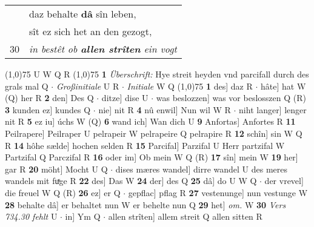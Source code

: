 \documentclass[8pt,a4paper,notitlepage]{article}
\begin{document}
\begin{table}[ht]
\begin{minipage}[t]{0.5\linewidth}
\begin{tabular}{rl}
 & daz behalte \textbf{dâ} sîn leben,\\ 
 & sît ez sich het an den gezogt,\\ 
30 & \textit{in bestêt ob \textbf{allen strîten} ein vogt}\\ 
\end{tabular}
\scriptsize
\line(1,0){75} \newline
U W Q R \newline
\line(1,0){75} \newline
\textbf{1} \textit{Überschrift:} Hye streit heyden vnd parcifall durch des grals mal Q   $\cdot$ \textit{Großinitiale} U R   $\cdot$ \textit{Initiale} W Q  \newline
\line(1,0){75} \newline
\textbf{1} des] daz R  $\cdot$ hâte] hat W (Q) her R \textbf{2} den] Des Q  $\cdot$ ditze] dise U  $\cdot$ was beslozzen] was vor beslosszen Q (R) \textbf{3} kunden ez] kundes Q  $\cdot$ nie] nit R \textbf{4} nû enwil] Nun wil W R  $\cdot$ niht langer] lenger nit R \textbf{5} ez iu] úchs W (Q) \textbf{6} wand ich] Wan dich U \textbf{9} Anfortas] Anfortes R \textbf{11} Peilrapere] Peilraper U pelrapeir W pelrapeire Q pelrapire R \textbf{12} schîn] sin W Q R \textbf{14} hôhe sælde] hochen selden R \textbf{15} Parcifal] Parzifal U Herr partzifal W Partzifal Q Parczifal R \textbf{16} oder im] Ob mein W Q (R) \textbf{17} sîn] mein W \textbf{19} her] gar R \textbf{20} möht] Mocht U Q  $\cdot$ dises mæres wandel] dirre wandel U des meres wandels mit fuͯge R \textbf{22} des] Das W \textbf{24} der] des Q \textbf{25} dâ] do U W Q  $\cdot$ der vrevel] die freuel W Q (R) \textbf{26} ez] er Q  $\cdot$ gepflac] pflag R \textbf{27} vestenunge] nun vestunge W \textbf{28} behalte dâ] er behaltet nun W er behelte nun Q \textbf{29} het] \textit{om.} W \textbf{30} \textit{Vers 734.30 fehlt} U   $\cdot$ in] Ym Q  $\cdot$ allen strîten] allem streit Q allen sitten R \newline
\end{minipage}
\end{table}
\end{document}
